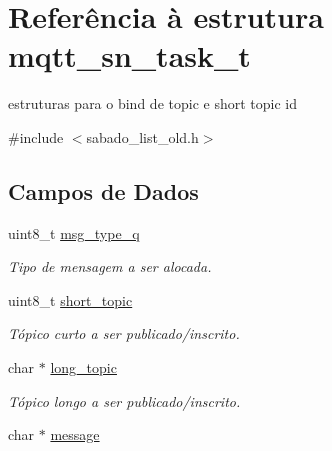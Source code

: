 \hypertarget{structmqtt__sn__task__t}{\section{Referência à estrutura mqtt\+\_\+sn\+\_\+task\+\_\+t}
\label{structmqtt__sn__task__t}
}


estruturas para o bind de topic e short topic id  




{\ttfamily \#include $<$sabado\+\_\+list\+\_\+old.\+h$>$}

\subsection*{Campos de Dados}
\begin{DoxyCompactItemize}
\item 
\hypertarget{structmqtt__sn__task__t_a6b9a925f3adb717097ee92e90a19a5c8}{uint8\+\_\+t \hyperlink{structmqtt__sn__task__t_a6b9a925f3adb717097ee92e90a19a5c8}{msg\+\_\+type\+\_\+q}}\label{structmqtt__sn__task__t_a6b9a925f3adb717097ee92e90a19a5c8}

\begin{DoxyCompactList}\small\item\em Tipo de mensagem a ser alocada. \end{DoxyCompactList}\item 
uint8\+\_\+t \hyperlink{structmqtt__sn__task__t_a3d9e943523a4987c87d38c91a8284f6a}{short\+\_\+topic}
\begin{DoxyCompactList}\small\item\em Tópico curto a ser publicado/inscrito. \end{DoxyCompactList}\item 
\hypertarget{structmqtt__sn__task__t_a64393dc28e568ae455af9bcd28eaeeac}{char $\ast$ \hyperlink{structmqtt__sn__task__t_a64393dc28e568ae455af9bcd28eaeeac}{long\+\_\+topic}}\label{structmqtt__sn__task__t_a64393dc28e568ae455af9bcd28eaeeac}

\begin{DoxyCompactList}\small\item\em Tópico longo a ser publicado/inscrito. \end{DoxyCompactList}\item 
\hypertarget{structmqtt__sn__task__t_ab8140947611504abcb64a4c277effcf5}{char $\ast$ \hyperlink{structmqtt__sn__task__t_ab8140947611504abcb64a4c277effcf5}{message}}\label{structmqtt__sn__task__t_ab8140947611504abcb64a4c277effcf5}


\end{DoxyCompactItemize}

